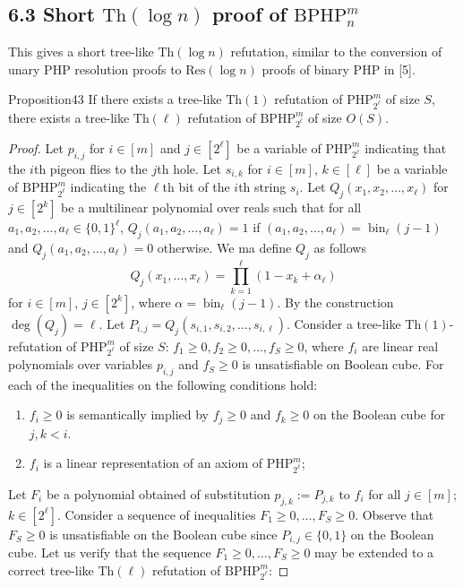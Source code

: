 \subsection*{6.3 Short $\mathrm{Th}(\log n)$ proof of $\mathrm{BPHP}_n^m$}
This gives a short tree-like $\mathrm{Th}(\log n)$ refutation, similar to the conversion of unary PHP resolution proofs to $\mathrm{Res}(\log n)$ proofs of binary PHP in [5].
\begin{authorclaim}{Proposition43}
If there exists a tree-like $\mathrm{Th}(1)$ refutation of $\mathrm{PHP}_{2^\ell}^m$ of size $S$, there exists a tree-like $\mathrm{Th}(\ell)$ refutation of $\mathrm{BPHP}_{2^\ell}^m$ of size $O(S)$.
\end{authorclaim}
\begin{proof}
Let $p_{i,j}$ for $i\in[m]$ and $j\in[2^\ell]$ be a variable of $\mathrm{PHP}_{2^\ell}^m$ indicating that the $i$th pigeon flies to the $j$th hole. Let $s_{i,k}$ for $i\in[m]$, $k\in[\ell]$ be a variable of $\mathrm{BPHP}_{2^\ell}^m$ indicating the $\ell$th bit of the $i$th string $s_i$.
Let $Q_j(x_1,x_2,\ldots,x_\ell)$ for $j\in[2^k]$ be a multilinear polynomial over reals such that for all $a_1,a_2,\ldots,a_\ell\in\{0,1\}^\ell$, $Q_j(a_1,a_2,\ldots,a_\ell)=1$ if $(a_1,a_2,\ldots,a_\ell)=\operatorname{bin}_\ell(j-1)$ and $Q_j(a_1,a_2,\ldots,a_\ell)=0$ otherwise. We ma define $Q_j$ as follows
\[
Q_j(x_1,\ldots,x_\ell)=\prod_{k=1}^{\ell}(1-x_k+\alpha_\ell)
\]
for $i\in[m]$, $j\in[2^k]$, where $\alpha=\operatorname{bin}_\ell(j-1)$. By the construction $\deg(Q_j)=\ell$.
Let $P_{i,j}=Q_j(s_{i,1},s_{i,2},\ldots,s_{i,\ell})$.
Consider a tree-like $\mathrm{Th}(1)$-refutation of $\mathrm{PHP}_{2^\ell}^m$ of size $S$: $f_1\ge0,f_2\ge0,\ldots,f_S\ge0$, where $f_i$ are linear real polynomials over variables $p_{i,j}$ and $f_S\ge0$ is unsatisfiable on Boolean cube. For each of the inequalities on the following conditions hold:
\begin{enumerate}
\item[(a)] $f_i\ge0$ is semantically implied by $f_j\ge0$ and $f_k\ge0$ on the Boolean cube for $j,k<i$.
\item[(b)] $f_i$ is a linear representation of an axiom of $\mathrm{PHP}_{2^\ell}^m$;
\end{enumerate}
Let $F_i$ be a polynomial obtained of substitution $p_{j,k}:=P_{j,k}$ to $f_i$ for all $j\in[m]$; $k\in[2^\ell]$.
Consider a sequence of inequalities $F_1\ge0,\ldots,F_S\ge0$. Observe that $F_S\ge0$ is unsatisfiable on the Boolean cube since $P_{i,j}\in\{0,1\}$ on the Boolean cube. Let us verify that the sequence $F_1\ge0,\ldots,F_S\ge0$ may be extended to a correct tree-like $\mathrm{Th}(\ell)$ refutation of $\mathrm{BPHP}_{2^\ell}^m$:

\end{proof}
